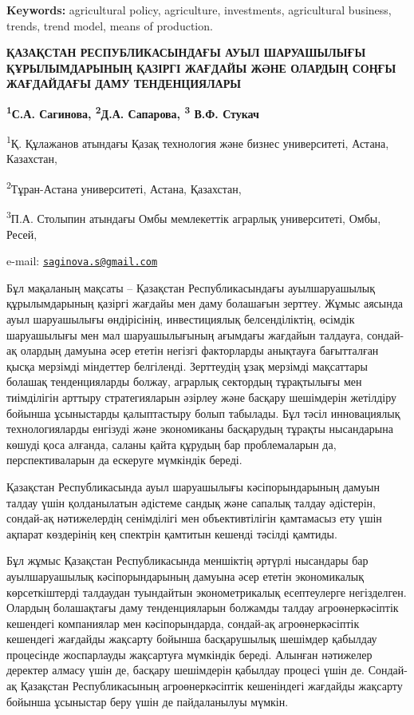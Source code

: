 {\bfseries Keywords:} agricultural policy, agriculture, investments,
agricultural business, trends, trend model, means of production.
\begin{articleheader}

{\bfseries ҚАЗАҚСТАН РЕСПУБЛИКАСЫНДАҒЫ АУЫЛ ШАРУАШЫЛЫҒЫ ҚҰРЫЛЫМДАРЫНЫҢ
ҚАЗІРГІ ЖАҒДАЙЫ ЖӘНЕ ОЛАРДЫҢ СОҢҒЫ ЖАҒДАЙДАҒЫ ДАМУ ТЕНДЕНЦИЯЛАРЫ}

{\bfseries \textsuperscript{1}С.А. Сагинова\textsuperscript{\envelope },
\textsuperscript{2}Д.А. Сапарова, \textsuperscript{3} В.Ф. Стукач}
\end{articleheader}
\begin{affiliation}

\textsuperscript{1}Қ. Құлажанов атындағы Қазақ технология және бизнес
университеті, Астана, Казахстан,

\textsuperscript{2}Тұран-Астана университеті, Астана, Қазахстан,

\textsuperscript{3}П.А. Столыпин атындағы Омбы мемлекеттік аграрлық
университеті, Омбы, Ресей,

e-mail:
\href{mailto:saginova.s@gmail.com}{\nolinkurl{saginova.s@gmail.com}}
\end{affiliation}

Бұл мақаланың мақсаты -- Қазақстан Республикасындағы ауылшаруашылық
құрылымдарының қазіргі жағдайы мен даму болашағын зерттеу. Жұмыс аясында
ауыл шаруашылығы өндірісінің, инвестициялық белсенділіктің, өсімдік
шаруашылығы мен мал шаруашылығының ағымдағы жағдайын талдауға, сондай-ақ
олардың дамуына әсер ететін негізгі факторларды анықтауға бағытталған
қысқа мерзімді міндеттер белгіленді. Зерттеудің ұзақ мерзімді мақсаттары
болашақ тенденцияларды болжау, аграрлық сектордың тұрақтылығы мен
тиімділігін арттыру стратегияларын әзірлеу және басқару шешімдерін
жетілдіру бойынша ұсыныстарды қалыптастыру болып табылады. Бұл тәсіл
инновациялық технологияларды енгізуді және экономиканы басқарудың
тұрақты нысандарына көшуді қоса алғанда, саланы қайта құрудың бар
проблемаларын да, перспективаларын да ескеруге мүмкіндік береді.

Қазақстан Республикасында ауыл шаруашылығы кәсіпорындарының дамуын
талдау үшін қолданылатын әдістеме сандық және сапалық талдау әдістерін,
сондай-ақ нәтижелердің сенімділігі мен объективтілігін қамтамасыз ету
үшін ақпарат көздерінің кең спектрін қамтитын кешенді тәсілді қамтиды.

Бұл жұмыс Қазақстан Республикасында меншіктің әртүрлі нысандары бар
ауылшаруашылық кәсіпорындарының дамуына әсер ететін экономикалық
көрсеткіштерді талдаудан туындайтын эконометрикалық есептеулерге
негізделген. Олардың болашақтағы даму тенденцияларын болжамды талдау
агроөнеркәсіптік кешендегі компаниялар мен кәсіпорындарда, сондай-ақ
агроөнеркәсіптік кешендегі жағдайды жақсарту бойынша басқарушылық
шешімдер қабылдау процесінде жоспарлауды жақсартуға мүмкіндік береді.
Алынған нәтижелер деректер алмасу үшін де, басқару шешімдерін қабылдау
процесі үшін де. Сондай-ақ Қазақстан Республикасының агроөнеркәсіптік
кешеніндегі жағдайды жақсарту бойынша ұсыныстар беру үшін де
пайдаланылуы мүмкін.

